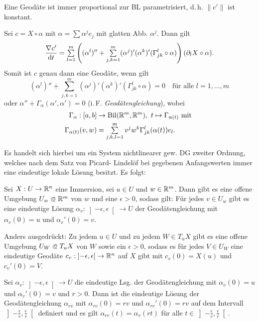 \documentclass{cheat-sheet}
\newcommand{\Bil}{\mathrm{Bil}}
\newcommand{\ointervall}[1]{\left]#1\right[} %
\begin{document}
\begin{satz}
  Eine Geodäte ist immer proportional zur BL parametrisiert, d.\,h. $\|c'\|$ ist konstant.
\end{satz}

\begin{bem}
  Sei $c = X \circ \alpha$ mit $\alpha = \sum \alpha^j e_j$ mit glatten Abb. $\alpha^j$. Dann gilt
  \[ \frac{\nabla c'}{\d t} = \sum_{l=1}^m \left( (\alpha^l)'' + \sum_{j,k=1}^m (\alpha^j)' (\alpha^k)' (\Gamma_{jk}^l \circ \alpha) \right) (\partial_l X \circ \alpha). \]
  Somit ist $c$ genau dann eine Geodäte, wenn gilt
  \[ (\alpha^l)'' + \sum_{j,k=1}^m (\alpha^j)' (\alpha^k)' (\Gamma_{jk}^l \circ \alpha) = 0 \quad \text{für alle $l = 1, ..., m$} \]
  oder $\alpha'' + \Gamma_{\alpha}(\alpha', \alpha') = 0$ (i.\,F. \emph{Geodätengleichung}), wobei
  \begin{align*}
    \Gamma_{\alpha} : [a, b] &\to \Bil(\R^m, \R^m), \  t \mapsto \Gamma_{\alpha(t)} \text{ mit }\\
    \Gamma_{\alpha(t)}(v, w) &= \sum_{j,k,l=1}^m v^j w^k \Gamma_{jk}^l (\alpha(t)) e_l.
  \end{align*}
\end{bem}

\begin{bem}
  Es handelt sich hierbei um ein System nichtlinearer gew. DG zweiter Ordnung, welches nach dem Satz von Picard- Lindelöf bei gegebenen Anfangswerten immer eine eindeutige lokale Lösung besitzt. Es folgt:
\end{bem}

\begin{satz}
  Sei $X : U \to \mathbb{R}^n$ eine Immersion, sei $u \in U$ und $w \in \mathbb{R}^m$. Dann gibt es eine offene Umgebung $U_w \opn \R^m$ von $w$ und eine $\epsilon > 0$, sodass gilt: Für jedes $v \in U_w$ gibt es eine eindeutige Lösung $\alpha_v : \ointervall{-\epsilon, \epsilon} \to U$ der Geodätengleichung mit $\alpha_v(0) = u$ und $\alpha_v'(0) = v$.

  Anders ausgedrückt: Zu jedem $u \in U$ und zu jedem $W \in T_u X$ gibt es eine offene Umgebung $U_W \opn T_u X$ von $W$ sowie ein $\epsilon > 0$, sodass es für jedes $V \in U_W$ eine eindeutige Geodäte $c_v : \ointervall{-\epsilon, \epsilon} \to \R^n$ auf $X$ gibt mit $c_v(0) = X(u)$ und $c_v'(0) = V$.
\end{satz}

\begin{satz}
  Sei $\alpha_v : \ointervall{-\epsilon, \epsilon} \to U$ die eindeutige Lsg. der Geodätengleichung mit $\alpha_v(0) = u$ und $\alpha_v'(0) = v$ und $r > 0$. Dann ist die eindeutige Lösung der Geodätengleichung $\alpha_{rv}$ mit $\alpha_{rv}(0) = rv$ und $\alpha_{rv}'(0) = rv$ auf dem Intervall $\ointervall{-\tfrac{\epsilon}{r}, \tfrac{\epsilon}{r}}$ definiert und es gilt
  $\alpha_{rv}(t) = \alpha_v(rt)$ für alle $t \in \ointervall{-\tfrac{\epsilon}{r}, \tfrac{\epsilon}{r}}$.
\end{satz}
\end{document}
